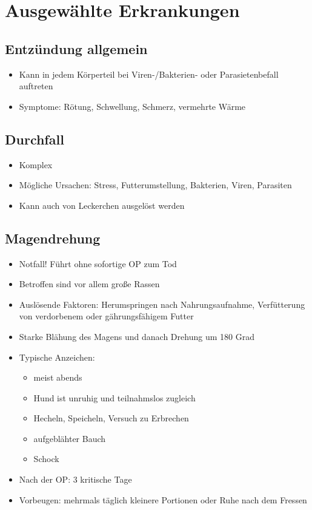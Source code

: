 \section{Ausgewählte Erkrankungen}


    \subsection{Entzündung allgemein}
    \begin{itemize}
        \item Kann in jedem Körperteil bei Viren-/Bakterien- oder Parasietenbefall auftreten
        \item Symptome: Rötung, Schwellung, Schmerz, vermehrte Wärme
    \end{itemize}

    \subsection{Durchfall}
    \begin{itemize}
        \item Komplex
        \item Mögliche Ursachen: Stress, Futterumstellung, Bakterien, Viren, Parasiten
        \item Kann auch von \glqq Leckerchen\grqq{} ausgelöst werden
    \end{itemize}

    \subsection{Magendrehung}
    \begin{itemize}
        \item Notfall! Führt ohne sofortige OP zum Tod
        \item Betroffen sind vor allem große Rassen
        \item Auslösende Faktoren: Herumspringen nach Nahrungsaufnahme, Verfütterung von verdorbenem oder gährungsfähigem Futter
        \item Starke Blähung des Magens und danach Drehung um 180 Grad
        \item Typische Anzeichen:
        \begin{itemize}
            \item meist abends
            \item Hund ist unruhig und teilnahmslos zugleich
            \item Hecheln, Speicheln, Versuch zu Erbrechen
            \item aufgeblähter Bauch
            \item Schock
        \end{itemize}
        \item Nach der OP: 3 kritische Tage
        \item Vorbeugen: mehrmals täglich kleinere Portionen oder Ruhe nach dem Fressen
    \end{itemize}


